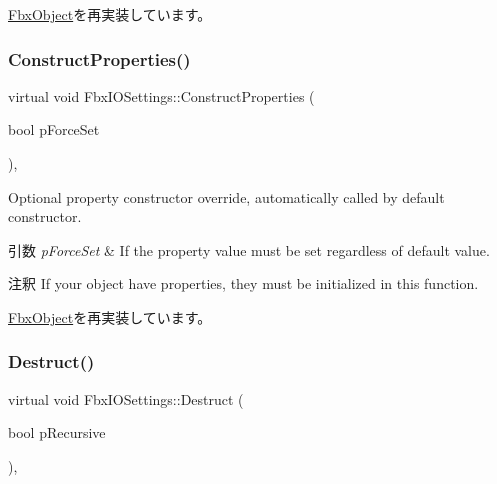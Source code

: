 \hyperlink{class_fbx_object_a313503bc645af3fdceb4a99ef5cea7eb}{Fbx\+Object}を再実装しています。

\mbox{\label{class_fbx_i_o_settings_a376a4234985ee351448dfe5b3ee8b128}} 
\subsubsection{\texorpdfstring{Construct\+Properties()}{ConstructProperties()}}
{\footnotesize\ttfamily virtual void Fbx\+I\+O\+Settings\+::\+Construct\+Properties (\begin{DoxyParamCaption}\item[{bool}]{p\+Force\+Set }\end{DoxyParamCaption})\hspace{0.3cm}{\ttfamily [protected]}, {\ttfamily [virtual]}}

Optional property constructor override, automatically called by default constructor. 
\begin{DoxyParams}{引数}
{\em p\+Force\+Set} & If the property value must be set regardless of default value. \\
\hline
\end{DoxyParams}
\begin{DoxyRemark}{注釈}
If your object have properties, they must be initialized in this function. 
\end{DoxyRemark}


\hyperlink{class_fbx_object_ad44f814323dc1b5e78bff1bfc608b4bb}{Fbx\+Object}を再実装しています。

\mbox{\label{class_fbx_i_o_settings_ab1680fefd56c9ad5abff5709b905a617}} 
\subsubsection{\texorpdfstring{Destruct()}{Destruct()}}
{\footnotesize\ttfamily virtual void Fbx\+I\+O\+Settings\+::\+Destruct (\begin{DoxyParamCaption}\item[{bool}]{p\+Recursive }\end{DoxyParamCaption})\hspace{0.3cm}{\ttfamily [protected]}, {\ttfamily [virtual]}}

